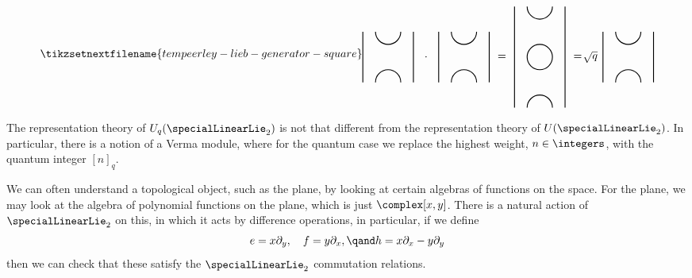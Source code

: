\documentclass[fleqn]{NotesClass}
\begin{document}
    \begin{equation}
        \tikzsetnextfilename{tempeerley-lieb-generator-square}
        \begin{tikzpicture}[baseline=(current bounding box), scale=0.8]
            \draw [thick] (0, 0) -- ++ (0, -2);
            \draw [thick] (0.5, 0) arc (180:360:0.5);
            \draw [thick] (0.5, -2) arc (180:0:0.5);
            \draw [thick] (2, 0) -- ++ (0, -2);
            \node at (2.5, -1) {\(\cdot\)};
            \begin{scope}[xshift=3cm]
                \draw [thick] (0, 0) -- ++ (0, -2);
                \draw [thick] (0.5, 0) arc (180:360:0.5);
                \draw [thick] (0.5, -2) arc (180:0:0.5);
                \draw [thick] (2, 0) -- ++ (0, -2);
            \end{scope}
            \node at (5.5, -1) {\(=\)};
            \begin{scope}[xshift=6cm, yshift=1cm]
                \draw [thick] (0, 0) -- ++ (0, -4);
                \draw [thick] (0.5, 0) arc (180:360:0.5);
                \draw [thick] (0.5, -4) arc (180:0:0.5);
                \draw [thick] (1, -2) circle [radius = 0.5];
                \draw [thick] (2, 0) -- ++ (0, -4);
            \end{scope}
            \node at (8.5, -1) {\(=\)};
            \node at (9, -1) {\(\sqrt{q}\)};
            \begin{scope}[xshift=9.5cm]
                \draw [thick] (0, 0) -- ++ (0, -2);
                \draw [thick] (0.5, 0) arc (180:360:0.5);
                \draw [thick] (0.5, -2) arc (180:0:0.5);
                \draw [thick] (2, 0) -- ++ (0, -2);
            \end{scope}
        \end{tikzpicture}
    \end{equation}
    
    The representation theory of \(U_q(\specialLinearLie_2)\) is not that different from the representation theory of \(U(\specialLinearLie_2)\).
    In particular, there is a notion of a Verma module, where for the quantum case we replace the highest weight, \(n \in \integers\), with the quantum integer \([n]_q\).
    
    We can often understand a topological object, such as the plane, by looking at certain algebras of functions on the space.
    For the plane, we may look at the algebra of polynomial functions on the plane, which is just \(\complex[x, y]\).
    There is a natural action of \(\specialLinearLie_2\) on this, in which it acts by difference operations, in particular, if we define
    \begin{equation}
        e = x \partial_y, \quad f = y \partial_x, \qand h = x \partial_x - y \partial_y
    \end{equation}
    then we can check that these satisfy the \(\specialLinearLie_2\) commutation relations.
    
\end{document}
